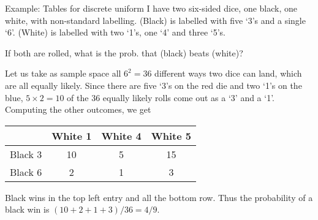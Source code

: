 \documentclass[11pt,pdf,ngerman,UKenglish]{beamer}%
\newcommand{\1}{\mathbb{1}}
\theoremstyle{thm}
\theoremstyle{def}
\begin{document}
\begin{frame}{Example: Tables for discrete uniform}
I have two six-sided dice, one black, one white, with non-standard labelling. (Black) is labelled with five `3's and a single `6'.  (White) is labelled with two `1's, one `4' and three `5's.

If both are rolled, what is the prob. that (black) beats (white)?
\vspace*{2mm}

\pause
Let us take as sample space all $6^2=36$ different ways two dice can land, which are all equally likely.  Since there are five `3's on the red die and two `1's on the blue,  $5 \times 2 = 10$ of the 36 equally likely rolls come out as a `3' and a `1'.  Computing the other outcomes, we get 
\begin{center}
\begin{tabular}{|c|ccc|}
 \hline 
   & White 1 & White 4 &  White 5 \\ 
  \hline
 Black 3 & 10 & 5 & 15   \\
 Black 6 & 2 & 1  & 3  \\
 \hline
\end{tabular}
\end{center}
Black wins in the top left entry and all the bottom row.  Thus the probability of a black win is $(10+2+1+3)/36 = 4/9$. 
\end{frame}
\end{document}
